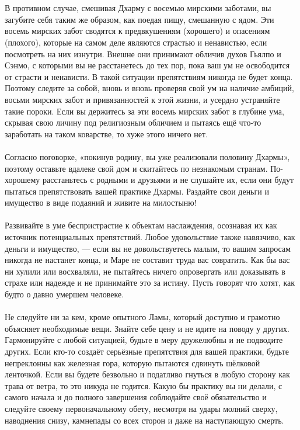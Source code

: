 \\ \\ В противном случае, смешивая Дхарму с восемью мирскими заботами, вы загубите себя таким же образом, как поедая пищу, смешанную с ядом. Эти восемь мирских забот сводятся к предвкушениям (хорошего) и опасениям (плохого), которые на самом деле являются страстью и ненавистью, если посмотреть на них изнутри. Внешне они принимают обличив духов Гьялпо и Сэнмо, с которыми вы не расстанетесь до тех пор, пока ваш ум не освободится от страсти и ненависти. В такой ситуации препятствиям никогда не будет конца. Поэтому следите за собой, вновь и вновь проверяя свой ум на наличие амбиций, восьми мирских забот и привязанностей к этой жизни, и усердно устраняйте такие пороки. Если вы держитесь за эти восемь мирских забот в глубине ума, скрывая свою личину под религиозным обличием и пытаясь ещё что-то заработать на таком коварстве, то хуже этого ничего нет.
\\ \\ Согласно поговорке, «покинув родину, вы уже реализовали половину Дхармы», поэтому оставьте вдалеке свой дом и скитайтесь по незнакомым странам. По-хорошему расстаньтесь с родными и друзьями и не слушайте их, если они будут пытаться препятствовать вашей практике Дхармы. Раздайте свои деньги и имущество в виде подаяний и живите на милостыню!
\\ \\ Развивайте в уме беспристрастие к объектам наслаждения, осознавая их как источник потенциальных препятствий. Любое удовольствие также навязчиво, как деньги и имущество, — если вы не довольствуетесь малым, то вашим запросам никогда не настанет конца, и Маре не составит труда вас совратить. Как бы вас ни хулили или восхваляли, не пытайтесь ничего опровергать или доказывать в страхе или надежде и не принимайте это за истину. Пусть говорят что хотят, как будто о давно умершем человеке.
\\ \\ Не следуйте ни за кем, кроме опытного Ламы, который доступно и грамотно объясняет необходимые вещи. Знайте себе цену и не идите на поводу у других. Гармонируйте с любой ситуацией, будьте в меру дружелюбны и не подводите других. Если кто-то создаёт серьёзные препятствия для вашей практики, будьте непреклонны как железная гора, которую пытаются сдвинуть шёлковой ленточкой. Если вы будете безвольно и податливо гнуться в любую сторону как трава от ветра, то это никуда не годится. Какую бы практику вы ни делали, с самого начала и до полного завершения соблюдайте своё обязательство и следуйте своему первоначальному обету, несмотря на удары молний сверху, наводнения снизу, камнепады со всех сторон и даже на наступающую смерть.
